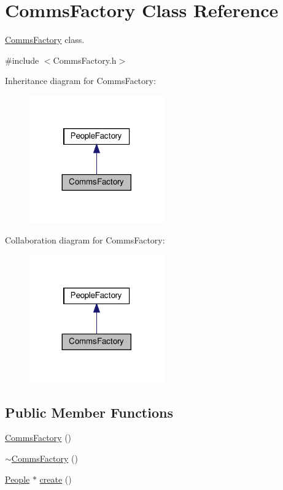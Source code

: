 \hypertarget{classCommsFactory}{}\section{Comms\+Factory Class Reference}
\label{classCommsFactory}


\hyperlink{classCommsFactory}{Comms\+Factory} class.  




{\ttfamily \#include $<$Comms\+Factory.\+h$>$}



Inheritance diagram for Comms\+Factory\+:\nopagebreak
\begin{figure}[H]
\begin{center}
\leavevmode
\includegraphics[width=164pt]{classCommsFactory__inherit__graph}
\end{center}
\end{figure}


Collaboration diagram for Comms\+Factory\+:\nopagebreak
\begin{figure}[H]
\begin{center}
\leavevmode
\includegraphics[width=164pt]{classCommsFactory__coll__graph}
\end{center}
\end{figure}
\subsection*{Public Member Functions}
\begin{DoxyCompactItemize}
\item 
\hyperlink{classCommsFactory_aa07ffd7bffb6002195c8a2c18fa344be}{Comms\+Factory} ()
\item 
\hyperlink{classCommsFactory_ac5f4f8909ae9fd5d86ac41812227bdef}{$\sim$\+Comms\+Factory} ()
\item 
\hyperlink{classPeople}{People} $\ast$ \hyperlink{classCommsFactory_a424583e920e224310d47ea5e32f74ce3}{create} ()
\end{DoxyCompactItemize}


